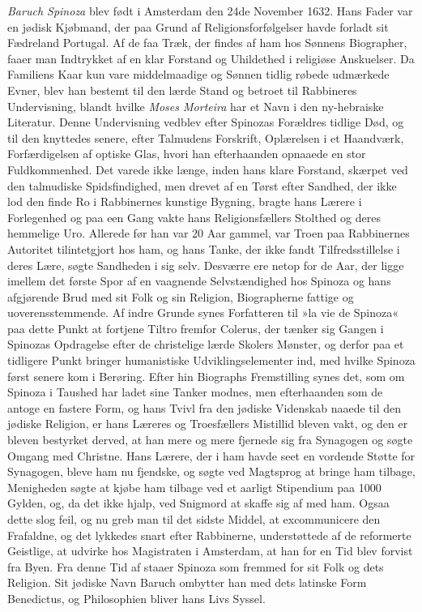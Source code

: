\documentclass[12pt,a4paper]{book}
\newcommand{\opage}[1]{\marginnote{\footnotesize\textit{[#1]}}}
\begin{document}
\emph{Baruch Spinoza} blev født i Amsterdam den 24de November 1632. Hans
Fader var en jødisk Kjøbmand, der paa Grund af Religionsforfølgelser havde
forladt sit Fædreland Portugal. Af de faa Træk, der findes af ham hos
\opage{29} Sønnens Biographer, faaer man Indtrykket af en klar Forstand og Uhildethed
i religiøse Anskuelser. Da Familiens Kaar kun vare middelmaadige og Sønnen
tidlig røbede udmærkede Evner, blev han bestemt til den lærde Stand og
betroet til Rabbineres Undervisning, blandt hvilke \emph{Moses Morteira}
har et Navn i den ny-hebraiske Literatur. Denne Undervisning vedblev efter
Spinozas Forældres tidlige Død, og til den knyttedes senere, efter
Talmudens Forskrift, Oplærelsen i et Haandværk, Forfærdigelsen af optiske
Glas, hvori han efterhaanden opnaaede en stor Fuldkommenhed. Det varede
ikke længe, inden hans klare Forstand, skærpet ved den talmudiske
Spidsfindighed, men drevet af en Tørst efter Sandhed, der ikke lod den
finde Ro i Rabbinernes kunstige Bygning, bragte hans Lærere i Forlegenhed
og paa een Gang vakte hans Religionsfællers Stolthed og deres hemmelige
Uro. Allerede før han var 20 Aar gammel, var Troen paa Rabbinernes
Autoritet tilintetgjort hos ham, og hans Tanke, der ikke fandt
Tilfredsstillelse i deres Lære, søgte Sandheden i sig selv. Desværre ere
netop for de Aar, der ligge imellem det første Spor af en vaagnende
Selvstændighed hos Spinoza og hans afgjørende Brud med sit Folk og sin
Religion, Biographerne fattige og uoverensstemmende. Af indre Grunde synes
Forfatteren til »la vie de Spinoza« paa dette Punkt at fortjene Tiltro
fremfor Colerus, der tænker sig Gangen i Spinozas Opdragelse efter de
christelige lærde Skolers Mønster, og derfor paa et tidligere Punkt
bringer humanistiske Udviklingselementer ind, med hvilke Spinoza først
senere kom i Berøring. Efter hin Biographs Fremstilling synes det, som om
Spinoza i Taushed har ladet sine Tanker modnes, men efterhaanden som de
antoge en fastere Form, og hans Tvivl fra den jødiske Videnskab naaede til
den jødiske Religion, er hans Læreres og Troesfællers Mistillid bleven
vakt, og den er bleven bestyrket derved, at han mere og mere fjernede sig
fra Synagogen og søgte Omgang med Christne. Hans Lærere, der i ham havde
seet en vordende Støtte for Synagogen, bleve ham nu fjendske, og søgte ved
Magtsprog at bringe ham
\opage{30} tilbage, Menigheden søgte at kjøbe ham tilbage ved et aarligt Stipendium
paa 1000 Gylden, og, da det ikke hjalp, ved Snigmord at skaffe sig af med
ham. Ogsaa dette slog feil, og nu greb man til det sidste Middel, at
excommunicere den Frafaldne, og det lykkedes snart efter Rabbinerne,
understøttede af de reformerte Geistlige, at udvirke hos Magistraten i
Amsterdam, at han for en Tid blev forvist fra Byen. Fra denne Tid af
staaer Spinoza som fremmed for sit Folk og dets Religion. Sit jødiske Navn
Baruch ombytter han med dets latinske Form Benedictus, og Philosophien
bliver hans Livs Syssel.
\end{document}
